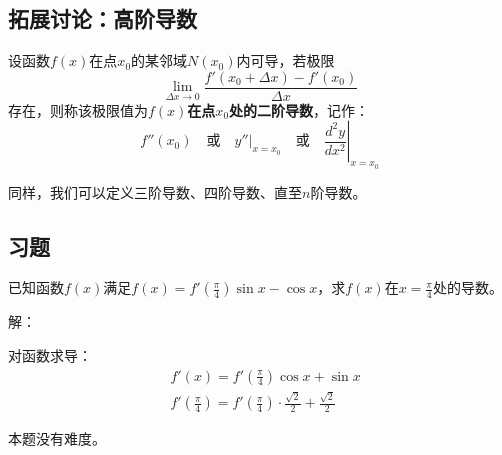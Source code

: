 \subsection{拓展讨论：高阶导数}

\begin{definition}[二阶导数]
设函数$f\left( x \right) $在点$x_0$的某邻域$N\left( x_0 \right) $内可导，若极限
\[
\underset{\Delta x\rightarrow 0}{\lim}\frac{f'\left( x_0+\Delta x \right) -f'\left( x_0 \right)}{\Delta x}
\]
存在，则称该极限值为{\bf $f\left( x \right) $在点$x_0$处的二阶导数}，记作：
\[
f''\left( x_0 \right) \quad \text{或} \quad \left. y'' \right|_{x=x_0} \quad \text{或} \quad \left. \frac{d^2y}{dx^2} \right|_{x=x_0}
\]
\end{definition}

同样，我们可以定义三阶导数、四阶导数、直至$n$阶导数。

\subsection{习题}

\begin{example}
已知函数$f\left( x \right) $满足$f\left( x \right) =f'\left( \frac{\pi}{4} \right) \sin x-\cos x$，求$f\left( x \right) $在$x=\frac{\pi}{4}$处的导数。
\end{example}

解：

对函数求导：
\begin{align*}
&f'\left( x \right) =f'\left( \frac{\pi}{4} \right) \cos x+\sin x \\
&f'\left( \frac{\pi}{4} \right) =f'\left( \frac{\pi}{4} \right) \cdot \frac{\sqrt{2}}{2}+\frac{\sqrt{2}}{2}
\end{align*}

\begin{tcolorbox}
本题没有难度。
\end{tcolorbox}




